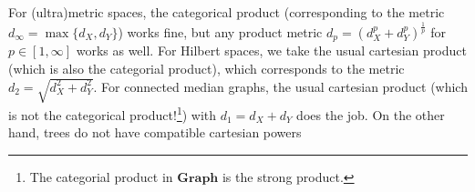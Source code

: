 \documentclass[a4paper]{article}
\theoremstyle{definition}
\DeclareMathOperator\Hom{Hom}
\begin{document}
%
%


For (ultra)metric spaces, the categorical product (corresponding to the metric $d_\infty=\max\{d_X,d_Y\}$) works fine, but any product metric $d_p=(d_X^p+d_Y^p)^{\frac1p}$ for $p\in[1,\infty]$ works as well.
For Hilbert spaces, we take the usual cartesian product (which is also the categorial product), which corresponds to the metric $d_2=\sqrt{d_X^2+d_Y^2}$.
For connected median graphs, the usual cartesian product (which is not the categorical product!\footnote{The categorial product in $\mathbf{Graph}$ is the strong product.}) with $d_1=d_X+d_Y$ does the job.
On the other hand, trees do not have compatible cartesian powers


\end{document}
